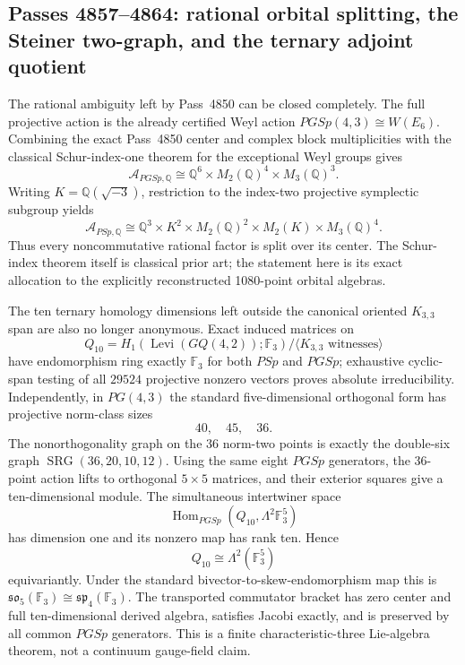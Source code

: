 \subsection{Passes 4857--4864: rational orbital splitting, the Steiner two-graph, and the ternary adjoint quotient}
\label{subsec:pass4857-4864}

The rational ambiguity left by Pass~4850 can be closed completely.  The full projective action is the already certified Weyl action $PGSp(4,3)\cong W(E_6)$.  Combining the exact Pass~4850 center and complex block multiplicities with the classical Schur-index-one theorem for the exceptional Weyl groups gives
\[
 \mathcal A_{PGSp,\mathbb Q}\cong
 \mathbb Q^6\times M_2(\mathbb Q)^4\times M_3(\mathbb Q)^3.
\]
Writing $K=\mathbb Q(\sqrt{-3})$, restriction to the index-two projective symplectic subgroup yields
\[
 \mathcal A_{PSp,\mathbb Q}\cong
 \mathbb Q^3\times K^2\times M_2(\mathbb Q)^2\times M_2(K)\times M_3(\mathbb Q)^4.
\]
Thus every noncommutative rational factor is split over its center.  The Schur-index theorem itself is classical prior art; the statement here is its exact allocation to the explicitly reconstructed 1080-point orbital algebras.

The ten ternary homology dimensions left outside the canonical oriented $K_{3,3}$ span are also no longer anonymous.  Exact induced matrices on
\[
 Q_{10}=H_1(\operatorname{Levi}(GQ(4,2));\mathbb F_3)/\langle K_{3,3}\text{ witnesses}\rangle
\]
have endomorphism ring exactly $\mathbb F_3$ for both $PSp$ and $PGSp$; exhaustive cyclic-span testing of all $29524$ projective nonzero vectors proves absolute irreducibility.  Independently, in $PG(4,3)$ the standard five-dimensional orthogonal form has projective norm-class sizes
\[
 40,\quad45,\quad36.
\]
The nonorthogonality graph on the 36 norm-two points is exactly the double-six graph $\operatorname{SRG}(36,20,10,12)$.  Using the same eight $PGSp$ generators, the 36-point action lifts to orthogonal $5\times5$ matrices, and their exterior squares give a ten-dimensional module.  The simultaneous intertwiner space
\[
 \operatorname{Hom}_{PGSp}(Q_{10},\Lambda^2\mathbb F_3^5)
\]
has dimension one and its nonzero map has rank ten.  Hence
\[
 \boxed{Q_{10}\cong\Lambda^2(\mathbb F_3^5)}
\]
equivariantly.  Under the standard bivector-to-skew-endomorphism map this is $\mathfrak{so}_5(\mathbb F_3)\cong\mathfrak{sp}_4(\mathbb F_3)$.  The transported commutator bracket has zero center and full ten-dimensional derived algebra, satisfies Jacobi exactly, and is preserved by all common $PGSp$ generators.  This is a finite characteristic-three Lie-algebra theorem, not a continuum gauge-field claim.

